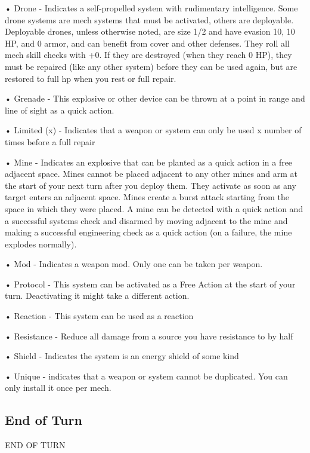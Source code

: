 •  \hypertarget{Drone}{Drone} - Indicates a self-propelled system with rudimentary intelligence. Some drone systems
  are mech systems that must be activated, others are deployable. Deployable drones, unless
  otherwise noted, are size 1/2 and have evasion 10, 10 HP, and 0 armor, and can benefit from
  cover and other defenses. They roll all mech skill checks with +0. If they are destroyed (when
  they reach 0 HP), they must be repaired (like any other system) before they can be used again,
  but are restored to full hp when you rest or full repair.

•  \hypertarget{Grenade}{Grenade} - This explosive or other device can be thrown at a point in range and line of sight as
  a quick action.

•  \hypertarget{Limited}{Limited (x)} - Indicates that a weapon or system can only be used x number of times before a
  full repair

•  \hypertarget{Mine}{Mine} - Indicates an explosive that can be planted as a quick action in a free adjacent space.
  Mines cannot be placed adjacent to any other mines and arm at the start of your next turn after
  you deploy them. They activate as soon as any target enters an adjacent space. Mines create a
  burst attack starting from the space in which they were placed. A mine can be detected with a
  quick action and a successful systems check and disarmed by moving adjacent to the mine
  and making a successful engineering check as a quick action (on a failure, the mine explodes
  normally).

•  Mod - Indicates a weapon mod. Only one can be taken per weapon.

•  \hypertarget{Protocol}{Protocol} - This system can be activated as a Free Action at the start of your turn. Deactivating
  it might take a different action.

•  \hypertarget{Reaction}{Reaction} - This system can be used as a reaction

•  \hypertarget{Resistance}{Resistance} - Reduce all damage from a source you have resistance to by half

•  \hypertarget{Shield}{Shield} - Indicates the system is an energy shield of some kind

•  \hypertarget{Unique}{Unique} - indicates that a weapon or system cannot be duplicated. You can only install it once
  per mech.

\subsection{End of Turn}
\hypertarget{EndOfTurn}{END OF TURN}

